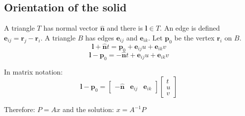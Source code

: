 



\subsection{Orientation of the solid}
A triangle $T$ has normal vector $\mathbf{\hat n}$ and there is $\mathbf l\in T$. An edge is defined $\mathbf e_{ij} = \mathbf r_j - \mathbf r_i$. A triangle $B$ has edges $\mathbf e_{ij}$ and $\mathbf e_{ik}$. Let $\mathbf p_0$ be the vertex $\mathbf r_i$ on $B$. 
$$ \mathbf l + \mathbf{\hat n}t = \mathbf p_0 + \mathbf e_{ij}u + \mathbf e_{ik}v $$
$$ \mathbf l - \mathbf p_0 =  -\mathbf{\hat n}t + \mathbf e_{ij}u + \mathbf e_{ik}v $$

In matrix notation:
$$ \mathbf l - \mathbf p_0 = 
 \begin{bmatrix}
  -\mathbf{\hat n} & \mathbf e_{ij} & \mathbf e_{ik}
 \end{bmatrix}
 \begin{bmatrix}
  t \\
  u \\
  v
 \end{bmatrix}
$$

Therefore: $P = Ax$ and the solution: $x = A^{-1} P$

